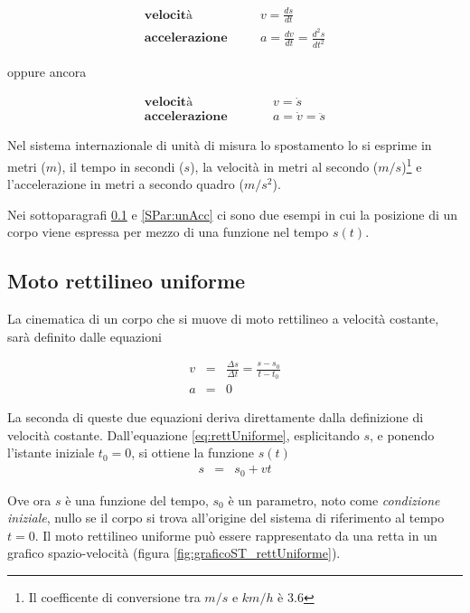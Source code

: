 \documentclass[17pt]{extarticle}
\begin{document}
\begin{eqnarray}
	\textbf{velocità}&\quad & v = \frac{ds}{dt}\\
	\textbf{accelerazione}&\quad & a = \frac{dv}{dt} = \frac{d^2s}{dt^2}
\end{eqnarray}

oppure ancora

\begin{eqnarray}
	\textbf{velocità}& \qquad & v = \dot{s}\\
	\textbf{accelerazione}& \qquad & a = \dot{v} = \ddot{s}
\end{eqnarray}


Nel sistema internazionale di unità di misura lo spostamento lo si esprime in metri ($m$), il tempo in secondi ($s$), la velocità in metri al secondo ($m/s$)\footnote{Il coefficente di conversione tra $m/s$ e $km/h$ è 3.6} e l'accelerazione in metri a secondo quadro ($m/s^2$).

Nei sottoparagrafi \ref{SPar:rettUn} e \ref{SPar:unAcc} ci sono due esempi in cui la posizione di un corpo viene espressa per mezzo di una funzione nel tempo $s(t)$.


\subsection{Moto rettilineo uniforme}\label{SPar:rettUn}

La cinematica di un corpo che si muove di moto rettilineo a velocità costante, sarà definito dalle equazioni

\begin{eqnarray}\label{eq:rettUniforme}
	v & = & \frac{\Delta s}{\Delta t} = \frac{s - s_0}{t - t_0}\\
	a & = & 0
\end{eqnarray}

La seconda di queste due equazioni deriva direttamente dalla definizione di velocità costante.
Dall'equazione \ref{eq:rettUniforme}, esplicitando $s$, e ponendo l'istante iniziale $t_0 = 0$, si ottiene la funzione $s(t)$
\begin{eqnarray}\label{eq:retUn}
	s & = & s_0 + vt
\end{eqnarray}

Ove ora $s$ è una funzione del tempo, $s_0$ è un parametro, noto come \emph{condizione iniziale}, nullo se il corpo si trova all'origine del sistema di riferimento al tempo $t = 0$. Il moto rettilineo uniforme può essere rappresentato da una retta in un grafico spazio-velocità (figura \ref{fig:graficoST_rettUniforme}).
\end{document}

